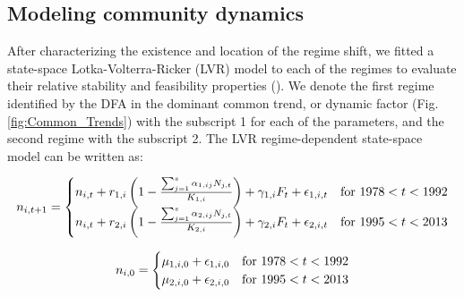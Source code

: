 \documentclass[12pt]{article}
\begin{document}
\subsection*{Modeling community dynamics}
\label{subsec:Modeling community dynamics}

After characterizing the existence and location of the regime shift, we fitted a state-space Lotka-Volterra-Ricker (LVR) model to each of the regimes to evaluate their relative stability and feasibility properties (\cite{Almaraz2011,Almaraz2012,Mutshinda2011}). We denote the first regime identified by the DFA in the dominant common trend, or dynamic factor (Fig. \ref{fig:Common_Trends}) with the subscript 1 for each of the parameters, and the second regime with the subscript 2. The LVR regime-dependent state-space model can be written as:

\begin{equation}\label{LVR_State_Equation_form}
	n_{i,t+1} =
	\begin{cases}
		n_{i,t} + r_{1,i}\left(1 - \frac{\sum_{j=1}^{s}\alpha_{1,ij}N_{j,t}}{K_{1,i}} \right) + \gamma_{1,i}F_{t} + \epsilon_{1,i,t} & \text{for $ 1978 < t < 1992 $}\\
		n_{i,t} + r_{2,i}\left(1 - \frac{\sum_{j=1}^{s}\alpha_{2,ij}N_{j,t}}{K_{2,i}} \right) + \gamma_{2,i}F_{t} + \epsilon_{2,i,t} & \text{for $ 1995 < t < 2013 $}\\
	\end{cases}
\end{equation}

\begin{equation}\label{LVR_Initial_State}
	n_{i,0} =
	\begin{cases}
		\mu_{1,i,0} + \epsilon_{1,i,0} & \text{for $ 1978 < t < 1992 $}\\
		\mu_{2,i,0} + \epsilon_{2,i,0} & \text{for $ 1995 < t < 2013 $}\\
	\end{cases}
\end{equation}
\end{document}
